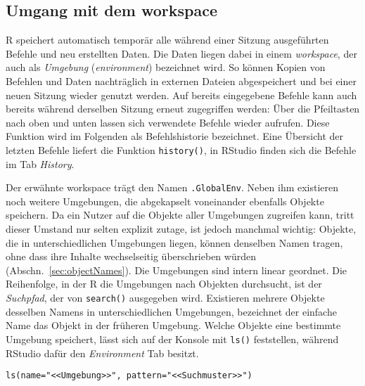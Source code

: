 \subsection{Umgang mit dem workspace}
\label{sec:workspace}

R speichert automatisch temporär alle während einer Sitzung ausgeführten Befehle und neu erstellten Daten. Die Daten liegen dabei in einem \emph{workspace}, der auch als \emph{Umgebung} (\emph{environment}) bezeichnet wird. So können Kopien von Befehlen und Daten nachträglich in externen Dateien abgespeichert und bei einer neuen Sitzung wieder genutzt werden. Auf bereits eingegebene Befehle kann auch bereits während derselben Sitzung erneut zugegriffen werden: Über die Pfeiltasten nach oben und unten lassen sich verwendete Befehle wieder aufrufen. Diese Funktion wird im Folgenden als Befehlshistorie bezeichnet. Eine Übersicht der letzten Befehle liefert die Funktion \lstinline!history()!, in RStudio finden sich die Befehle im Tab \emph{History}.

Der erwähnte workspace trägt den Namen  \lstinline!.GlobalEnv!. Neben ihm existieren noch weitere Umgebungen, die abgekapselt voneinander ebenfalls Objekte speichern. Da ein Nutzer auf die Objekte aller Umgebungen zugreifen kann, tritt dieser Umstand nur selten explizit zutage, ist jedoch manchmal wichtig: Objekte, die in unterschiedlichen Umgebungen liegen, können denselben Namen tragen, ohne dass ihre Inhalte wechselseitig überschrieben würden (Abschn.\ \ref{sec:objectNames}). Die Umgebungen sind intern linear geordnet. Die Reihenfolge, in der R die Umgebungen nach Objekten durchsucht, ist der \emph{Suchpfad}, der von  \lstinline!search()! ausgegeben wird. Existieren mehrere Objekte desselben Namens in unterschiedlichen Umgebungen, bezeichnet der einfache Name das Objekt in der früheren Umgebung. Welche Objekte eine bestimmte Umgebung speichert, lässt sich auf der Konsole mit \lstinline!ls()! feststellen, während RStudio dafür den \emph{Environment} Tab besitzt.
\begin{lstlisting}
ls(name="<<Umgebung>>", pattern="<<Suchmuster>>")
\end{lstlisting}

